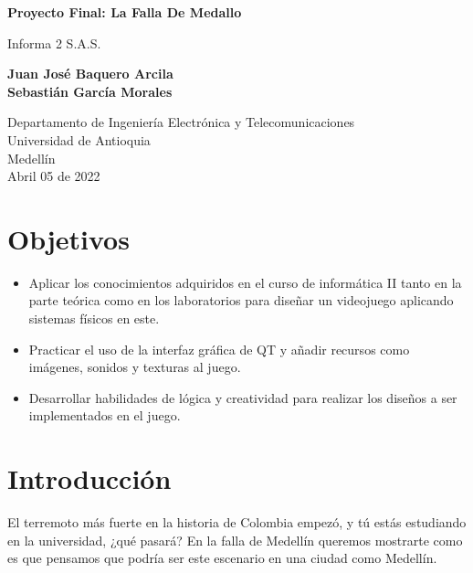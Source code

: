 \documentclass{article}
\begin{document}
\begin{titlepage}
    \begin{center}
        \vspace*{1cm}
            
        \Huge
        \textbf{Proyecto Final: La Falla De Medallo}
            
        \vspace{0.5cm}
        \LARGE
        Informa 2 S.A.S.
            
        \vspace{1.5cm}
            
        \textbf{Juan José Baquero Arcila\\
                Sebastián García Morales}

        \vfill
            
        \vspace{0.8cm}
            
        \Large
        Departamento de Ingeniería Electrónica y Telecomunicaciones\\
        Universidad de Antioquia\\
        Medellín\\
        Abril 05 de 2022
    \end{center}
\end{titlepage}

\tableofcontents

\newpage
\section{Objetivos}\label{objetivos}
\begin{itemize}
    \item Aplicar los conocimientos adquiridos en el curso de informática II tanto en la parte teórica como en los laboratorios para diseñar un videojuego aplicando sistemas físicos en este.
    \item Practicar el uso de la interfaz gráfica de QT y añadir recursos como imágenes, sonidos y texturas al juego.
    \item Desarrollar habilidades de lógica y creatividad para realizar los diseños a ser implementados en el juego.
    
\end{itemize}
\section{Introducción}\label{intro}
El terremoto más fuerte en la historia de Colombia empezó, y tú estás estudiando en la universidad, ¿qué pasará? En la falla de Medellín queremos mostrarte como es que pensamos que podría ser este escenario en una ciudad como Medellín.\\
\end{document}
